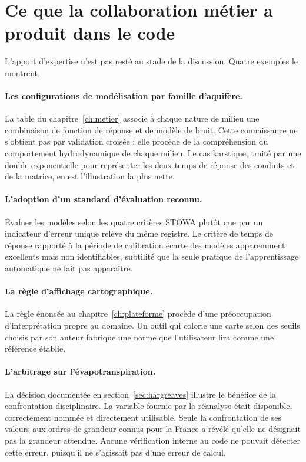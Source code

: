 \section{Ce que la collaboration métier a produit dans le code}

L'apport d'expertise n'est pas resté au stade de la discussion. Quatre exemples le montrent.

\paragraph{Les configurations de modélisation par famille d'aquifère.} La table du
chapitre~\ref{ch:metier} associe à chaque nature de milieu une combinaison de fonction de
réponse et de modèle de bruit. Cette connaissance ne s'obtient pas par validation croisée : elle
procède de la compréhension du comportement hydrodynamique de chaque milieu. Le cas karstique,
traité par une double exponentielle pour représenter les deux temps de réponse des conduits et
de la matrice, en est l'illustration la plus nette.

\paragraph{L'adoption d'un standard d'évaluation reconnu.} Évaluer les modèles selon les quatre
critères STOWA plutôt que par un indicateur d'erreur unique relève du même registre. Le critère
de temps de réponse rapporté à la période de calibration écarte des modèles apparemment
excellents mais non identifiables, subtilité que la seule pratique de l'apprentissage
automatique ne fait pas apparaître.

\paragraph{La règle d'affichage cartographique.} La règle énoncée au chapitre~\ref{ch:plateforme}
procède d'une préoccupation d'interprétation propre au domaine. Un outil qui colorie une carte
selon des seuils choisis par son auteur fabrique une norme que l'utilisateur lira comme une
référence établie.

\paragraph{L'arbitrage sur l'évapotranspiration.} La décision documentée en
section~\ref{sec:hargreaves} illustre le bénéfice de la confrontation disciplinaire. La variable
fournie par la réanalyse était disponible, correctement nommée et directement utilisable. Seule
la confrontation de ses valeurs aux ordres de grandeur connus pour la France a révélé qu'elle ne
désignait pas la grandeur attendue. Aucune vérification interne au code ne pouvait détecter
cette erreur, puisqu'il ne s'agissait pas d'une erreur de calcul.

